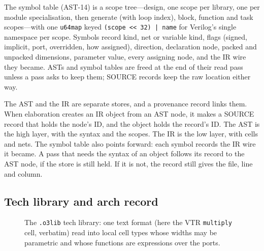\documentclass[conference]{IEEEtran}
\newcommand{\code}[1]{\texttt{#1}}
\begin{document}
The symbol table (AST-14) is a scope tree---design, one scope per library, one per module
specialisation, then generate (with loop index), block, function and task scopes---with one
\code{u64map} keyed \code{(scope << 32) | name} for Verilog's single namespace per scope.
Symbols record kind, net or variable kind, flags (signed, implicit, port, overridden, how
assigned), direction, declaration node, packed and unpacked dimensions, parameter value, every
assigning node, and the IR wire they became. ASTs and symbol tables are freed at the end of
their read pass unless a pass asks to keep them; SOURCE records keep the raw location either way.

The AST and the IR are separate stores, and a provenance record links them. When elaboration
creates an IR object from an AST node, it makes a SOURCE record that holds the node's ID, and the
object holds the record's ID. The AST is the high layer, with the syntax and the scopes. The IR is
the low layer, with cells and nets. The symbol table also points forward: each symbol records the
IR wire it became. A pass that needs the syntax of an object follows its record to the AST node,
if the store is still held. If it is not, the record still gives the file, line and column.

\subsection{Tech library and arch record}
\label{sec:techlib}

\begin{figure}[t]
\centering
\odinfit{\columnwidth}{}
\caption{The \code{.o3lib} tech library: one text format (here the VTR \code{multiply} cell,
verbatim) read into local cell types whose widths may be parametric and whose functions are
expressions over the ports.}
\label{fig:techlib}
\end{figure}
\end{document}
